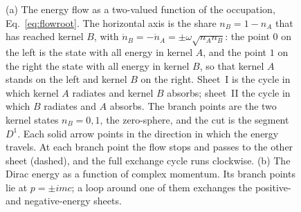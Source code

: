 \documentclass[%
 reprint, amsmath,amssymb, aps, prb, ]{revtex4-2}
\numberwithin{equation}{section}
\begin{document}
\begin{figure}[t!]
\begin{minipage}{0.95\columnwidth}
\justifying\small
(a) The energy flow as a two-valued function of the occupation, Eq.~\eqref{eq:flowroot}. The horizontal axis is the share $n_B=1-n_A$ that has reached kernel $B$, with $\dot n_B=-\dot n_A=\pm\omega\sqrt{n_An_B}$: the point $0$ on the left is the state with all energy in kernel $A$, and the point $1$ on the right the state with all energy in kernel $B$, so that kernel $A$ stands on the left and kernel $B$ on the right. Sheet~I is the cycle in which kernel $A$ radiates and kernel $B$ absorbs; sheet~II the cycle in which $B$ radiates and $A$ absorbs. The branch points are the two kernel states $n_B=0,1$, the zero-sphere, and the cut is the segment $D^1$. Each solid arrow points in the direction in which the energy travels. At each branch point the flow stops and passes to the other sheet (dashed), and the full exchange cycle runs clockwise. (b) The Dirac energy as a function of complex momentum. Its branch points lie at $p=\pm imc$; a loop around one of them exchanges the positive- and negative-energy sheets.
\end{minipage}
\end{figure}
\end{document}
